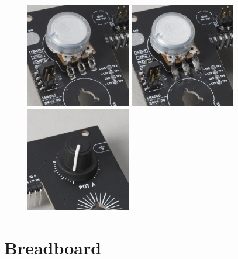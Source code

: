 \documentclass[12pt, a4paper]{article}
\begin{document}
\begin{figure}[H]
    \centering
    \includegraphics[width=46mm]{images/33_04_pot_lugs_bent.jpg}
    \hspace{2mm}
    \includegraphics[width=46mm]{images/33_05_pot_soldered.jpg}
    \hspace{2mm}
    \includegraphics[width=46mm]{images/33_06_knob_attached.jpg}
\end{figure}

\pagebreak
\section{Breadboard}
\end{document}
